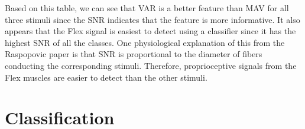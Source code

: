 \documentclass[12pt]{article}
\begin{document}
Based on this table, we can see that VAR is a better feature than MAV for all three stimuli since the SNR indicates that the feature is more informative. It also appears that the Flex signal is easiest to detect using a classifier since it has the highest SNR of all the classes. One physiological explanation of this from the Raspopovic paper is that SNR is proportional to the diameter of fibers conducting the corresponding stimuli. Therefore, proprioceptive signals from the Flex muscles are easier to detect than the other stimuli.

\section{Classification}
\end{document}
